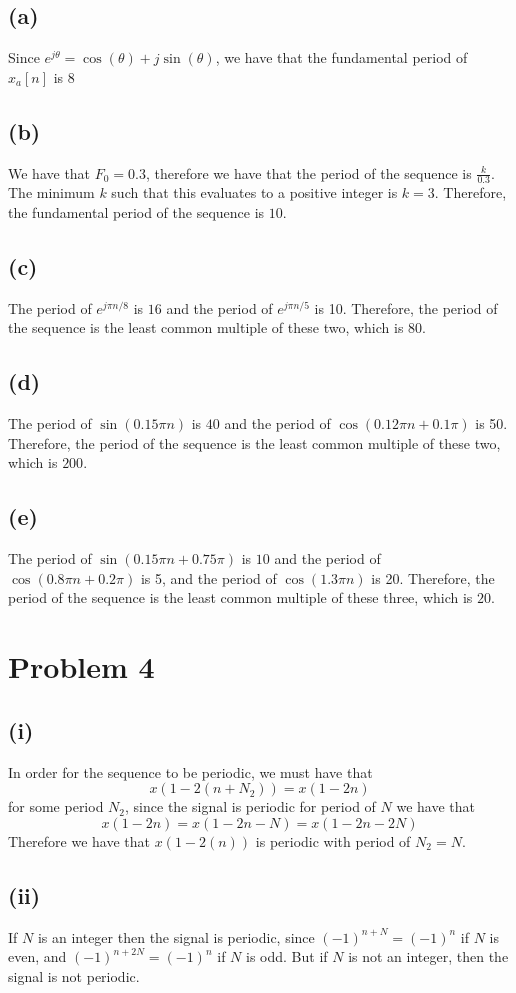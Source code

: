 \subsection*{(a)}
Since $e^{j\theta} = \cos(\theta) + j\sin(\theta)$, we have
that the fundamental period of $\hat{x}_a[n]$ is $\boxed{8}$
\subsection*{(b)}
We have that $F_0=0.3$, therefore we have that the period of the sequence
is $\frac{k}{0.3}$. The minimum $k$ such that this evaluates to a
positive integer is $k=3$. Therefore, the fundamental period of
the sequence is $\boxed{10}$.
\subsection*{(c)}
The period of $e^{j\pi n /8}$ is $16$ and the period of
 $e^{j\pi n /5}$ is 10. Therefore, the period of the sequence
 is the least common multiple of these two, which is $\boxed{80}$. 
\subsection*{(d)}
The period of $\sin(0.15\pi n)$ is $40$ and the period of
 $\cos(0.12\pi n+0.1\pi)$ is 50. Therefore, the period of the sequence
 is the least common multiple of these two, which is $\boxed{200}$. 
\subsection*{(e)}
The period of $\sin(0.15\pi n+0.75\pi)$ is $10$ and the period of
 $\cos(0.8\pi n+0.2\pi)$ is 5, and the period of $\cos(1.3\pi n)$ is 20. Therefore, the period of the sequence
 is the least common multiple of these three, which is $\boxed{20}$.
 \section*{Problem 4}
 \subsection*{(i)}
 In order for the sequence to be periodic, we must have that
 $$x(1-2(n+N_2)) = x(1-2n)$$
 for some period $N_2$, since the signal is periodic for period of 
 $N$ we have that
 $$x(1-2n)=x(1-2n-N)=x(1-2n-2N)$$
 Therefore we have that $x(1-2(n))$ is periodic with period of $N_2=N$.
\subsection*{(ii)}
If $N$ is an integer then the signal is periodic, since $(-1)^{n+N}=(-1)^{n}$
if $N$ is even, and $(-1)^{n+2N}=(-1)^{n}$ if $N$ is odd. But if 
$N$ is not an integer, then the signal is not periodic.
